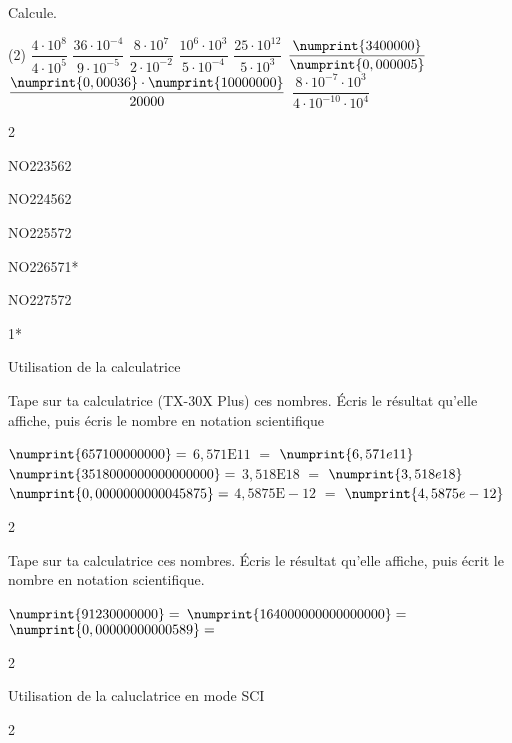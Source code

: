 \documentclass[a4paper,11pt]{report}
\begin{document}
\begin{exo}{
Calcule.
\begin{tasks}(2)
    \task $\dfrac{4\cdot10^8}{4\cdot10^5}$
    \task $\dfrac{36\cdot10^{-4}}{9\cdot10^{-5}}$
    \task $\dfrac{8\cdot10^7}{2\cdot10^{-2}}$
    \task $\dfrac{10^6\cdot10^3}{5\cdot10^{-4}}$
    \task $\dfrac{25\cdot10^{12}}{5\cdot10^3}$
    \task $\dfrac{\numprint{3400000}}{\numprint{0,000005}}$
    \task $\dfrac{\numprint{0,00036}\cdot\numprint{10000000}}{20000}$
    \task $\dfrac{8\cdot10^{-7}\cdot10^3}{4\cdot10^{-10}\cdot10^{4}}$
\end{tasks}
}{2}    
\end{exo}

\begin{exol}{NO223}{56}{2} %
\end{exol}

\begin{exol}{NO224}{56}{2} %
\end{exol}

\begin{exol}{NO225}{57}{2} %
\end{exol}

\begin{exol}{NO226}{57}{1*} %
\end{exol}

\begin{exol}{NO227}{57}{2} %
\end{exol}

\begin{FLP}{65}{1*}
\end{FLP}


\begin{resolu}{Utilisation de la calculatrice}{
    Tape sur ta calculatrice (TX-30X Plus) ces nombres. Écris le résultat qu'elle affiche, puis écris le nombre en notation scientifique 
    \begin{tasks}
    \task $\numprint{657100000000}=$ \underline{$6,571 \mathrm{E}11$} $=$ \underline{$\numprint{6,571e11}$}
    \task $\numprint{3518000000000000000}=$ \underline{$3,518 \mathrm{E}18$} $=$ \underline{$\numprint{3,518e18}$}
    \task $\numprint{0,0000000000045875}=$ \underline{$4,5875 \mathrm{E}-12$}  $=$ \underline{$\numprint{4,5875e-12}$}
\end{tasks}
}{2}
\end{resolu}

\begin{exop}{
Tape sur ta calculatrice ces nombres. Écris le résultat qu'elle affiche, puis écrit le nombre en notation scientifique.

\begin{tasks}
    \task $\numprint{91230000000}=$ \hrulefill
    \task $\numprint{164000000000000000}=$ \hrulefill
    \task $\numprint{0,00000000000589}=$ \hrulefill
\end{tasks}

}{2}    
\end{exop}


\begin{resolu}{Utilisation de la caluclatrice en mode SCI}{

}{2}    
\end{resolu}
\end{document}

